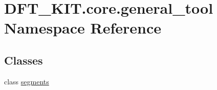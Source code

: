 \hypertarget{namespace_d_f_t___k_i_t_1_1core_1_1general__tool}{\section{D\+F\+T\+\_\+\+K\+I\+T.\+core.\+general\+\_\+tool Namespace Reference}
\label{namespace_d_f_t___k_i_t_1_1core_1_1general__tool}
}
\subsection*{Classes}
\begin{DoxyCompactItemize}
\item 
class \hyperlink{class_d_f_t___k_i_t_1_1core_1_1general__tool_1_1segments}{segments}
\end{DoxyCompactItemize}
